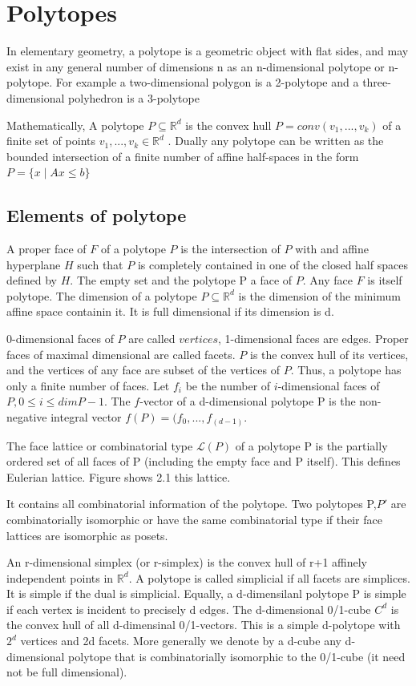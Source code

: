 \section{Polytopes}

In elementary geometry, a polytope is a geometric object with flat sides, and may exist in any general number of dimensions n as an n-dimensional polytope or n-polytope. For example a two-dimensional polygon is a 2-polytope and a three-dimensional polyhedron is a 3-polytope

Mathematically, A polytope $P\subseteq \mathbb{R}^d$ is the convex hull $P=conv(v_1,...,v_k)$ of a finite set of points $v_1,...,v_k \in \mathbb{R}^d$ . Dually any polytope can be written as the bounded intersection of a finite number of affine half-spaces in the form $P = \{ x\mid Ax \leq b \}$

\subsection{Elements of polytope}
A proper face of $F$ of a polytope $P$ is the intersection of $P$ with and affine hyperplane $H$ such that $P$ is completely contained in one of the closed half spaces defined by $H$. The empty set and the polytope P a face of $P$. Any face $F$ is itself  polytope. The dimension of a polytope $P \subseteq \mathbb{R}^d$ is the dimension of the minimum affine space containin it. It is full dimensional if its dimension is d.

0-dimensional faces of $P$ are called $vertices$, 1-dimensional faces are edges. Proper faces of maximal dimensional are called facets. $P$ is the convex hull of its vertices, and the vertices of any face are subset of the vertices of $P$. Thus, a polytope has only a finite number of faces. Let $f_i$ be the number of $i$-dimensional faces of $P,0 \leq i \leq dim P-1$. The $f$-vector of a d-dimensional polytope P is the non-negative integral vector $f(P) = (f_0,...,f_(d-1)$.

The face lattice or combinatorial type $\mathcal{L}(P)$ of a polytope P is the partially ordered set of all faces of P (including the empty face and P itself). This defines Eulerian lattice. Figure shows 2.1 this lattice.


It contains all combinatorial information of the polytope. Two polytopes P,$P'$ are combinatorially isomorphic or have the same combinatorial type if their face lattices are isomorphic as posets.

An r-dimensional simplex (or r-simplex) is the convex hull of r+1 affinely independent points in $\mathbb{R}^d$. A polytope is called simplicial if all facets are simplices. It is simple if the dual is simplicial. Equally, a d-dimensilanl polytope P is simple if each vertex is incident to precisely d edges. The d-dimensional 0/1-cube $C^d$ is the convex hull of all d-dimensinal 0/1-vectors. This is a simple d-polytope with $2^d$ vertices and 2d facets. More generally we denote by a d-cube any d-dimensional polytope that is combinatorially isomorphic to the 0/1-cube (it need not be full dimensional).

